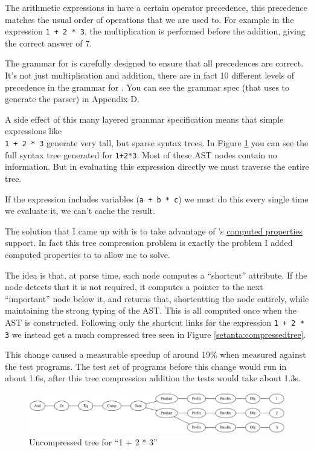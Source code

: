 The arithmetic expressions in \Setanta{} have a certain operator precedence, this precedence matches the usual order of operations that we are used to. For example in the expression \verb|1 + 2 * 3|, the multiplication is performed before the addition, giving the correct answer of 7.

The grammar for \Setanta{} is carefully designed to ensure that all precedences are correct.
It's not just multiplication and addition, there are in fact 10 different levels of precedence in the grammar for \Setanta{}.
You can see the \Setanta{} grammar spec (that \tsPEG{} uses to generate the parser) in Appendix D.

A side effect of this many layered grammar specification means that simple expressions like\\
\verb|1 + 2 * 3| generate very tall, but sparse syntax trees. In Figure \ref{setanta:uncompressedtree} you can see the full syntax tree generated for \verb|1+2*3|.
Most of these AST nodes contain no information. But in evaluating this expression directly we must traverse the entire tree.

If the expression includes variables (\verb|a + b * c|) we must do this every single time we evaluate it, we can't cache the result.

The solution that I came up with is to take advantage of \tsPEG{}'s \hyperref[computed-properties]{computed properties} support. In fact this tree compression problem is exactly the problem I added computed properties to \tsPEG{} to allow me to solve.

The idea is that, at parse time, each node computes a ``shortcut'' attribute. If the node detects that it is not required, it computes a pointer to the next ``important'' node below it, and returns that, shortcutting the node entirely, while maintaining the strong typing of the AST. This is all computed once when the AST is constructed. Following only the shortcut links for the expression \verb|1 + 2 * 3| we instead get a much compressed tree seen in Figure \ref{setanta:compressedtree}.

This change caused a measurable speedup of around 19\% when measured against the test programs. The test set of programs before this change would run in about 1.6s, after this tree compression addition the tests would take about 1.3s.

\begin{figure}
    \caption{Uncompressed tree for ``1 + 2 * 3''}
    \label{setanta:uncompressedtree}
    \begin{center}
    \includegraphics[scale=0.3]{app2assets/tallgraph}
    \end{center}
\end{figure}

